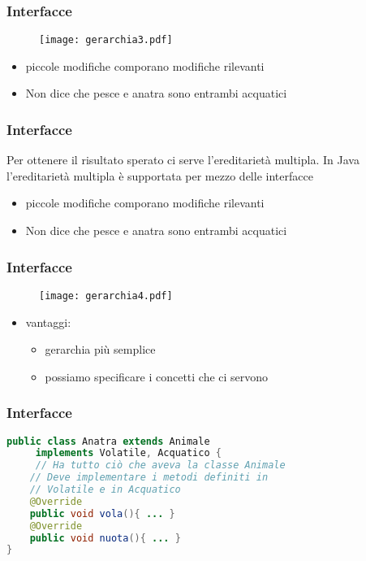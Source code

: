 \documentclass{beamer}
\begin{document}
\begin{frame}[fragile]
\frametitle{Interfacce}
\begin{figure}[h!]
  \centering
    \texttt{[image: gerarchia3.pdf]}
\end{figure}
\begin{itemize}
\item  piccole modifiche comporano modifiche rilevanti
\item Non dice che pesce e anatra sono entrambi acquatici
\end{itemize}
\end{frame}

\begin{frame}[fragile]
\frametitle{Interfacce}
Per ottenere il risultato sperato ci serve l'ereditariet\`a multipla. In Java l'ereditariet\`a multipla \`e supportata per mezzo delle interfacce
\begin{itemize}
\item  piccole modifiche comporano modifiche rilevanti
\item Non dice che pesce e anatra sono entrambi acquatici
\end{itemize}
\end{frame}

\begin{frame}[fragile]
\frametitle{Interfacce}
\begin{figure}[h!]
  \centering
    \texttt{[image: gerarchia4.pdf]}
\end{figure}
\begin{itemize}
\item vantaggi:
\begin{itemize}
\item gerarchia pi\`u semplice
\item possiamo specificare i concetti che ci servono
\end{itemize}
\end{itemize}
\end{frame}

\begin{frame}[fragile]
\frametitle{Interfacce}
\begin{lstlisting}[language=Java,escapechar=|]
public class Anatra extends Animale
     implements Volatile, Acquatico { 
     // Ha tutto ciò che aveva la classe Animale
    // Deve implementare i metodi definiti in 
    // Volatile e in Acquatico 
    @Override
    public void vola(){ ... }
    @Override    
    public void nuota(){ ... } 
}
\end{lstlisting}
\end{frame}
\end{document}
